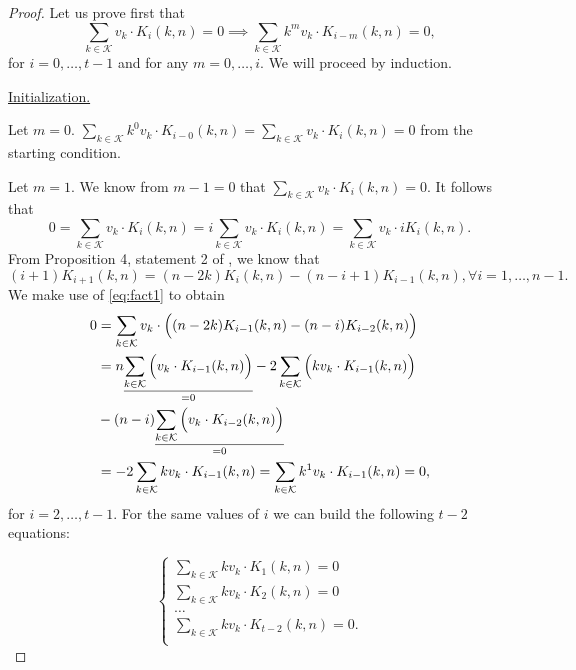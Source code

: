\begin{proof}
    Let us prove first that
    $$\sum_{k \in \mathcal{K}} v_k \cdot K_i(k, n) = 0 \implies \sum_{k \in \mathcal{K}} k^mv_k \cdot K_{i-m}(k, n) = 0,$$ for $i = 0, \ldots, t-1$ and for any $m = 0, \ldots, i$. We will proceed by induction.

    \underline{Initialization.}

    Let $m = 0$. $\sum_{k \in \mathcal{K}} k^0v_k \cdot K_{i-0}(k, n) = \sum_{k \in \mathcal{K}} v_k \cdot K_i(k, n) = 0$ from the starting condition.

    Let $m = 1$. We know from $m - 1 = 0$ that $\sum_{k \in \mathcal{K}} v_k \cdot K_i(k, n) = 0$. It follows that
    $$
    0 = \sum_{k \in \mathcal{K}} v_k \cdot K_i(k, n) = i\sum_{k \in \mathcal{K}} v_k \cdot K_i(k, n) = \sum_{k \in \mathcal{K}} v_k \cdot iK_i(k, n).
    $$
    From Proposition 4, statement 2 of \cite{DCC:DalMaiSar06}, we know that
    \begin{equation}\label{eq:fact1}
        (i+1)K_{i+1}(k, n) = (n - 2k)K_i(k,n) - (n - i + 1)K_{i-1}(k,n), \forall i = 1, \ldots, n - 1.
    \end{equation}
    We make use of \cref{eq:fact1} to obtain
    \begin{equation*}
    \begin{split}
        0 &= \sum_{k \in \mathcal{K}} v_k \cdot \Big( (n - 2k)K_{i-1}(k, n) - (n - i)K_{i-2}(k, n) \Big)\\
        & = n \underset{=0}{\underline{\sum_{k \in \mathcal{K}} \Big( v_k \cdot K_{i-1}(k, n) \Big)}} - 2\sum_{k \in \mathcal{K}} \Big( kv_k \cdot K_{i-1}(k, n) \Big)\\& - (n-i)\underset{=0}{\underline{\sum_{k \in \mathcal{K}} \Big( v_k \cdot K_{i-2}(k, n) \Big)}}\\
        &= -2\sum_{k \in \mathcal{K}} kv_k \cdot K_{i-1}(k, n) = \sum_{k \in \mathcal{K}} k^1v_k \cdot K_{i-1}(k, n) = 0,
    \end{split}
    \end{equation*}
    for $i = 2, \ldots, t-1$. For the same values of $i$ we can build the following $t-2$ equations:

    \begin{equation*}
        \begin{cases}
            \sum_{k \in \mathcal{K}} kv_k \cdot K_1(k, n) = 0\\
            \sum_{k \in \mathcal{K}} kv_k \cdot K_2(k, n) = 0\\
            \ldots\\
            \sum_{k \in \mathcal{K}} kv_k \cdot K_{t-2}(k, n) = 0.\\
        \end{cases}
    \end{equation*}


\end{proof}

